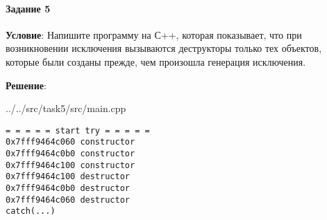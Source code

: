 \paragraph{Задание 5} \hspace{0pt}

\textbf{Условие}:
Напишите программу на С++, которая показывает, что при возникновении исключения вызываются деструкторы только тех объектов, которые были созданы прежде, чем произошла генерация исключения.

\textbf{Решение}:


{../../src/task5/src/main.cpp}

\begin{lstlisting}[language=Out,]
= = = = = start try = = = = =
0x7fff9464c060 constructor
0x7fff9464c0b0 constructor
0x7fff9464c100 constructor
0x7fff9464c100 destructor
0x7fff9464c0b0 destructor
0x7fff9464c060 destructor
catch(...)
\end{lstlisting}